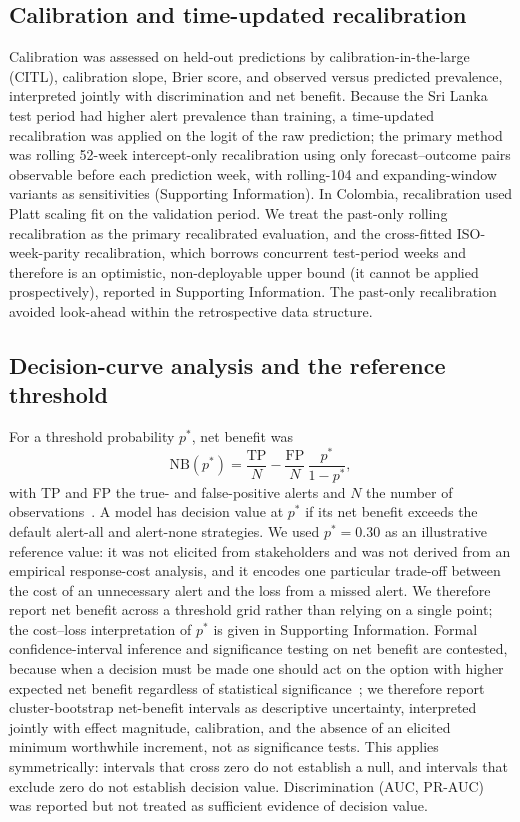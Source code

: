 \documentclass[11pt,a4paper]{article}
\begin{document}
\subsection{Calibration and time-updated recalibration}
Calibration was assessed on held-out predictions by calibration-in-the-large (CITL), calibration slope, Brier score, and observed versus predicted prevalence, interpreted jointly with discrimination and net benefit. Because the Sri Lanka test period had higher alert prevalence than training, a time-updated recalibration was applied on the logit of the raw prediction; the primary method was rolling 52-week intercept-only recalibration using only forecast--outcome pairs observable before each prediction week, with rolling-104 and expanding-window variants as sensitivities (Supporting Information). In Colombia, recalibration used Platt scaling fit on the validation period. We treat the past-only rolling recalibration as the primary recalibrated evaluation, and the cross-fitted ISO-week-parity recalibration, which borrows concurrent test-period weeks and therefore is an optimistic, non-deployable upper bound (it cannot be applied prospectively), reported in Supporting Information. The past-only recalibration avoided look-ahead within the retrospective data structure.

\subsection{Decision-curve analysis and the reference threshold}
For a threshold probability $p^*$, net benefit was
\[
\mathrm{NB}(p^*)=\frac{\mathrm{TP}}{N}-\frac{\mathrm{FP}}{N}\,\frac{p^*}{1-p^*},
\]
with TP and FP the true- and false-positive alerts and $N$ the number of observations~\cite{Vickers2006,Murphy1985,Tozan2023}. A model has decision value at $p^*$ if its net benefit exceeds the default alert-all and alert-none strategies. We used $p^*=0.30$ as an illustrative reference value: it was not elicited from stakeholders and was not derived from an empirical response-cost analysis, and it encodes one particular trade-off between the cost of an unnecessary alert and the loss from a missed alert. We therefore report net benefit across a threshold grid rather than relying on a single point; the cost--loss interpretation of $p^*$ is given in Supporting Information. Formal confidence-interval inference and significance testing on net benefit are contested, because when a decision must be made one should act on the option with higher expected net benefit regardless of statistical significance~\cite{Vickers2023}; we therefore report cluster-bootstrap net-benefit intervals as descriptive uncertainty, interpreted jointly with effect magnitude, calibration, and the absence of an elicited minimum worthwhile increment, not as significance tests. This applies symmetrically: intervals that cross zero do not establish a null, and intervals that exclude zero do not establish decision value. Discrimination (AUC, PR-AUC)~\cite{SaitoRehmsmeier2015} was reported but not treated as sufficient evidence of decision value.
\end{document}
